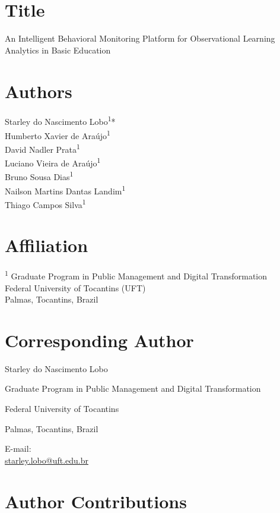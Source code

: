 \documentclass[12pt,a4paper]{article}
\begin{document}
\section*{Title}

An Intelligent Behavioral Monitoring Platform for Observational Learning Analytics in Basic Education

\section*{Authors}

Starley do Nascimento Lobo\textsuperscript{1}*\\
Humberto Xavier de Araújo\textsuperscript{1}\\
David Nadler Prata\textsuperscript{1}\\
Luciano Vieira de Araújo\textsuperscript{1}\\
Bruno Sousa Dias\textsuperscript{1}\\
Nailson Martins Dantas Landim\textsuperscript{1}\\
Thiago Campos Silva\textsuperscript{1}

\section*{Affiliation}

\textsuperscript{1} Graduate Program in Public Management and Digital Transformation\\
Federal University of Tocantins (UFT)\\
Palmas, Tocantins, Brazil

\section*{Corresponding Author}

Starley do Nascimento Lobo

Graduate Program in Public Management and Digital Transformation

Federal University of Tocantins

Palmas, Tocantins, Brazil

E-mail:\\
\href{mailto:starley.lobo@uft.edu.br}{starley.lobo@uft.edu.br}

\section*{Author Contributions}
\end{document}
